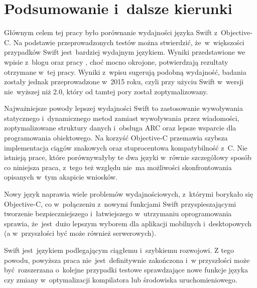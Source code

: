 \documentclass[mgr, shortabstract]{iithesis}
\begin{document}
\chapter{Podsumowanie i~dalsze kierunki}

Głównym celem tej pracy było porównanie wydajności języka Swift z~Objective-C. Na podstawie przeprowadzonych testów można stwierdzić, że~w~większości przypadków Swift jest~bardziej wydajnym językiem. Wyniki przedstawione we wpisie z~blogu \cite{yalantis} oraz pracy \cite{ijeast}, choć mocno okrojone, potwierdzają rezultaty otrzymane w~tej pracy. Wyniki z~wpisu \cite{guenzel} sugerują podobną wydajność, badania zostały jednak przeprowadzone w~2015 roku, czyli przy użyciu Swift w~wersji nie~wyższej niż 2.0, który od tamtej pory został zoptymalizowany.

Najważniejsze powody lepszej wydajności Swift to zastosowanie wywoływania statycznego i~dynamicznego metod zamiast wywoływania przez wiadomości, zoptymalizowane struktury danych i~obsługa ARC oraz lepsze wsparcie dla programowania obiektowego. Na korzyść Objective-C przemawia szybsza implementacja ciągów znakowych oraz stuprocentowa kompatybilność z~C. Nie istnieją prace, które porównywałyby te dwa języki w~równie szczegółowy sposób co niniejsza praca, z~tego też względu nie~ma możliwości skonfrontowania opisanych w~tym akapicie wniosków. 

Nowy język naprawia wiele problemów wydajnościowych, z~którymi borykało się Objective-C, co w~połączeniu z~nowymi funkcjami Swift przyspieszającymi tworzenie bezpieczniejszego i~łatwiejszego w~utrzymaniu oprogramowania sprawia, że~jest~dużo lepszym wyborem dla aplikacji mobilnych i~desktopowych (a w~przyszłości być może również serwerowych).
 
Swift jest~językiem podlegającym ciągłemu i~szybkiemu rozwojowi. Z tego powodu, powyższa praca nie~jest~definitywnie zakończona i~w przyszłości może być rozszerzana o~kolejne przypadki testowe sprawdzające nowe funkcje języka czy zmiany w~optymalizacji kompilatora lub środowiska uruchomieniowego.

\end{document}
